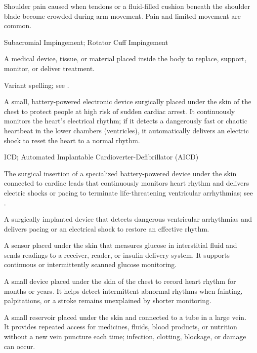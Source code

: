  Shoulder pain caused when tendons or a fluid-filled cushion beneath the shoulder blade become crowded during arm movement. Pain and limited movement are common.

\synonyms
Subacromial Impingement; Rotator Cuff Impingement

 A medical device, tissue, or material placed inside the body to replace, support, monitor, or deliver treatment.

 Variant spelling; see .

 A small, battery-powered electronic device surgically placed under the skin of the chest to protect people at high risk of sudden cardiac arrest. It continuously monitors the heart's electrical rhythm; if it detects a dangerously fast or chaotic heartbeat in the lower chambers (ventricles), it automatically delivers an electric shock to reset the heart to a normal rhythm.

\synonyms
ICD; Automated Implantable Cardioverter-Defibrillator (AICD)

 The surgical insertion of a specialized battery-powered device under the skin connected to cardiac leads that continuously monitors heart rhythm and delivers electric shocks or pacing to terminate life-threatening ventricular arrhythmias; see .

 A surgically implanted device that detects dangerous ventricular arrhythmias and delivers pacing or an electrical shock to restore an effective rhythm.

 A sensor placed under the skin that measures glucose in interstitial fluid and sends readings to a receiver, reader, or insulin-delivery system. It supports continuous or intermittently scanned glucose monitoring.

 A small device placed under the skin of the chest to record heart rhythm for months or years. It helps detect intermittent abnormal rhythms when fainting, palpitations, or a stroke remains unexplained by shorter monitoring.

 A small reservoir placed under the skin and connected to a tube in a large vein. It provides repeated access for medicines, fluids, blood products, or nutrition without a new vein puncture each time; infection, clotting, blockage, or damage can occur.


